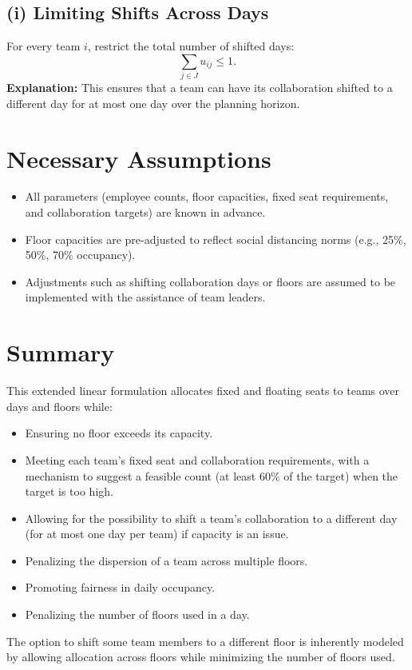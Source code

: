 \documentclass[11pt]{article}
\begin{document}
\subsection*{(i) Limiting Shifts Across Days}
For every team $i$, restrict the total number of shifted days:
\[
\sum_{j \in J} u_{ij} \leq 1.
\]
\textbf{Explanation:} This ensures that a team can have its collaboration shifted to a different day for at most one day over the planning horizon.

\section{Necessary Assumptions}
\begin{itemize}[leftmargin=2em]
    \item All parameters (employee counts, floor capacities, fixed seat requirements, and collaboration targets) are known in advance.
    \item Floor capacities are pre-adjusted to reflect social distancing norms (e.g., 25\%, 50\%, 70\% occupancy).
    \item Adjustments such as shifting collaboration days or floors are assumed to be implemented with the assistance of team leaders.
\end{itemize}

\section{Summary}
This extended linear formulation allocates fixed and floating seats to teams over days and floors while:
\begin{itemize}[leftmargin=2em]
    \item Ensuring no floor exceeds its capacity.
    \item Meeting each team’s fixed seat and collaboration requirements, with a mechanism to suggest a feasible count (at least 60\% of the target) when the target is too high.
    \item Allowing for the possibility to shift a team’s collaboration to a different day (for at most one day per team) if capacity is an issue.
    \item Penalizing the dispersion of a team across multiple floors.
    \item Promoting fairness in daily occupancy.
    \item Penalizing the number of floors used in a day.
\end{itemize}
The option to shift some team members to a different floor is inherently modeled by allowing allocation across floors while minimizing the number of floors used.
\end{document}
